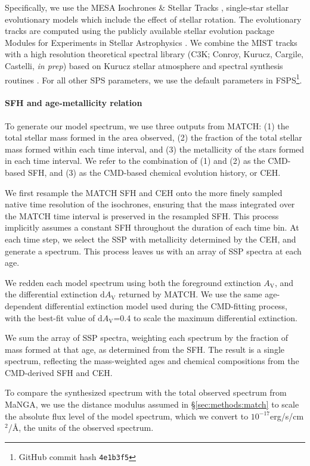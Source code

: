 \documentclass[preprint2]{aastex62}
\newcommand{\FSPS}{{\sc FSPS}\xspace}
\newcommand{\ang}{\ensuremath{\mbox{\AA}}\xspace}
\newcommand{\Av}{\ensuremath{A_{\mathrm{V}}}\xspace}
\newcommand{\dAv}{\ensuremath{\mathrm{d}A_{\mathrm{V}}}\xspace}
\begin{document}
Specifically, we use the MESA Isochrones \& Stellar Tracks \citep[MIST;][]{Dotter+2016, Choi+2016}, single-star stellar evolutionary models which include the effect of stellar rotation. The evolutionary tracks are computed using the publicly available stellar evolution package Modules for Experiments in Stellar Astrophysics \citep[MESA v7503;][]{Paxton+2011,Paxton+2013, Paxton+2015}. We combine the MIST tracks with a high resolution theoretical spectral library (C3K; Conroy, Kurucz, Cargile, Castelli, \emph{in prep}) based on Kurucz stellar atmosphere and spectral synthesis routines \citep[ATLAS12 and SYNTHE,][]{Kurucz+2005}. For all other SPS parameters, we use the default parameters in \FSPS\footnote{GitHub commit hash \texttt{4e1b3f5}}.

\paragraph{SFH and age-metallicity relation}
To generate our model spectrum, we use three outputs from MATCH: (1) the total stellar mass formed in the area observed, (2) the fraction of the total stellar mass formed within each time interval, and (3) the metallicity of the stars formed in each time interval. We refer to the combination of (1) and (2) as the CMD-based SFH, and (3) as the CMD-based chemical evolution history, or CEH.

We first resample the MATCH SFH and CEH onto the more finely sampled native time resolution of the isochrones, ensuring that the mass integrated over the MATCH time interval is preserved in the resampled SFH. This process implicitly assumes a constant SFH throughout the duration of each time bin. At each time step, we select the SSP with metallicity determined by the CEH, and generate a spectrum. This process leaves us with an array of SSP spectra at each age.

We redden each model spectrum using both the foreground extinction \Av, and the differential extinction \dAv returned by MATCH. We use the same age-dependent differential extinction model used during the CMD-fitting process, with the best-fit value of \dAv=0.4 to scale the maximum differential extinction.

We sum the array of SSP spectra, weighting each spectrum by the fraction of mass formed at that age, as determined from the SFH. The result is a single spectrum, reflecting the mass-weighted ages and chemical compositions from the CMD-derived SFH and CEH.

To compare the synthesized spectrum with the total observed spectrum from MaNGA, we use the distance modulus assumed in \S\ref{sec:methods:match} to scale the absolute flux level of the model spectrum, which we convert to $10^{-17}$erg/s/cm$^2$/\ang, the units of the observed spectrum.
\end{document}
